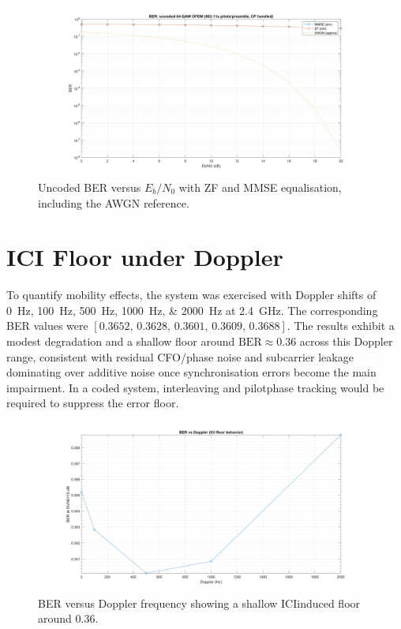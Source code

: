 \documentclass[journal,onecolumn]{IEEEtran}
\begin{document}
\begin{figure}[!t]
\centering
\includegraphics[width=\linewidth]{2.png}
\caption{Uncoded BER versus $E_b/N_0$ with ZF and MMSE equalisation, including the AWGN reference.}
\label{fig:ber}
\end{figure}

\section{ICI Floor under Doppler}
To quantify mobility effects, the system was exercised with Doppler shifts of \SIlist{0;100;500;1000;2000}{Hz} at \SI{2.4}{GHz}. The corresponding BER values were $[0.3652,\,0.3628,\,0.3601,\,0.3609,\,0.3688]$. The results exhibit a modest degradation and a shallow floor around $\mathrm{BER}\approx0.36$ across this Doppler range, consistent with residual CFO/phase noise and subcarrier leakage dominating over additive noise once synchronisation errors become the main impairment. In a coded system, interleaving and pilot\textendash phase tracking would be required to suppress the error floor.

\begin{figure}[!t]
\centering
\includegraphics[width=\linewidth]{1.png}
\caption{BER versus Doppler frequency showing a shallow ICI\textendash induced floor around 0.36.}
\label{fig:doppler}
\end{figure}
\end{document}
